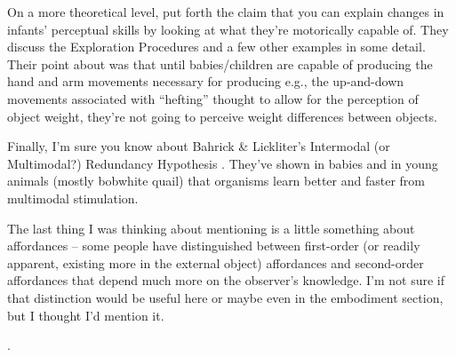 \fi

On a more theoretical level, \cite{bushnell93motor} put forth the
claim that you can explain changes in infants' perceptual skills by
looking at what they're motorically capable of.  They discuss the
\cite{lederman87hand} Exploration Procedures and a few other examples in
some detail.  Their point about  was that until
babies/children are capable of producing the hand and arm movements
necessary for producing e.g., the up-and-down movements associated
with ``hefting'' thought to allow for the perception of object weight,
they're not going to perceive weight differences between objects.

Finally, I'm sure you know about Bahrick \& Lickliter's Intermodal (or
Multimodal?) Redundancy Hypothesis \cite{bahrick00intersensory}.  
They've shown in babies and in
young animals (mostly bobwhite quail) that organisms learn better and
faster from multimodal stimulation.


\ifverbose

The last thing I was thinking about mentioning is a little something
about affordances -- some people have distinguished between
first-order (or readily apparent, existing more in the external
object) affordances and second-order affordances that depend much more
on the observer's knowledge.  I'm not sure if that distinction would
be useful here or maybe even in the embodiment section, but I thought
I'd mention it.

\fi

\nocite{lewkowicz00development}
\nocite{lewkowicz80crossmodal}
\nocite{lewkowicz04learning}
\nocite{bahrick04development}
\nocite{hernandez01development}
\nocite{bahrick03development}
\nocite{bahrick00intersensory}
\nocite{gibson86ecological}
\nocite{prince05synching}
\nocite{bushnell85recognition}.


